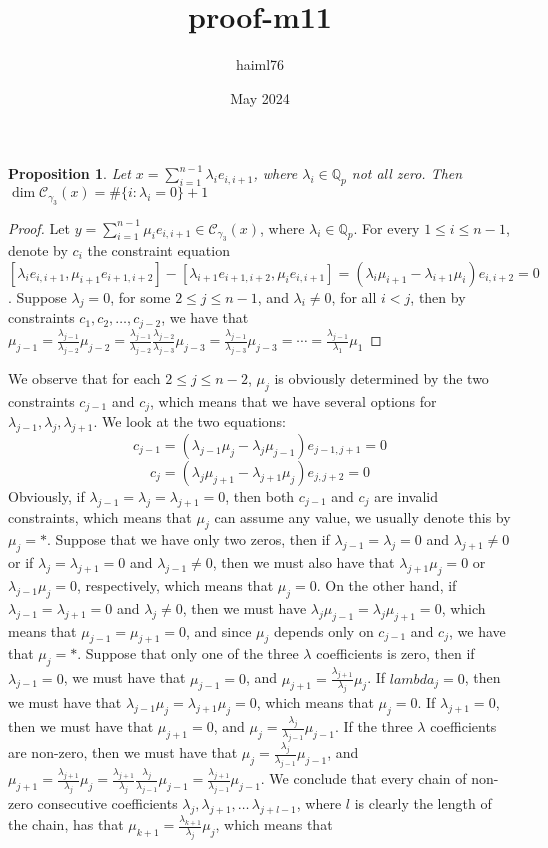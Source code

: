 \documentclass[12pt]{article}
\title{proof-m11}
\author{haiml76 }
\date{May 2024}
\newtheorem{proposition}[theorem]{Proposition}
\begin{document}
\begin{proposition}
Let $x=\sum_{i=1}^{n-1}\lambda_i e_{i,i+1}$, where $\lambda_i\in\mathbb{Q}_p$ not all zero. Then $\dim\mathcal{C}_{\gamma_3}(x)=\#\{i : \lambda_i=0\}+1$
\end{proposition}
\begin{proof}
Let $y=\sum_{i=1}^{n-1}\mu_i e_{i,i+1}\in\mathcal{C}_{\gamma_3}(x)$, where $\lambda_i\in\mathbb{Q}_p$.
For every $1\leq i\leq n-1$, denote by $c_i$ the constraint equation $[\lambda_i e_{i,i+1},\mu_{i+1}e_{i+1,i+2}]-[\lambda_{i+1}e_{i+1,i+2},\mu_i e_{i,i+1}]=(\lambda_i\mu_{i+1}-\lambda_{i+1}\mu_i)e_{i,i+2}=0$. Suppose $\lambda_j=0$, for some $2\leq j\leq n-1$, and $\lambda_i\neq 0$, for all $i<j$, then by constraints $c_1,c_2,\dots,c_{j-2}$, we have that $\mu_{j-1}=\frac{\lambda_{j-1}}{\lambda_{j-2}}\mu_{j-2}=\frac{\lambda_{j-1}}{\lambda_{j-2}}\frac{\lambda_{j-2}}{\lambda_{j-3}}\mu_{j-3}=\frac{\lambda_{j-1}}{\lambda_{j-3}}\mu_{j-3}=\cdots=\frac{\lambda_{j-1}}{\lambda_1}\mu_1$
\end{proof}




We observe that for each $2\leq j\leq n-2$, $\mu_j$ is obviously determined by the two constraints $c_{j-1}$ and $c_j$, which means that we have several options for $\lambda_{j-1},\lambda_j,\lambda_{j+1}$. We look at the two equations: \[
c_{j-1}=(\lambda_{j-1}\mu_j-\lambda_j\mu_{j-1})e_{j-1,j+1}=0
\]\[
c_j=(\lambda_j\mu_{j+1}-\lambda_{j+1}\mu_j)e_{j,j+2}=0
\]
Obviously, if $\lambda_{j-1}=\lambda_j=\lambda_{j+1}=0$, then both $c_{j-1}$ and $c_j$ are invalid constraints, which means that $\mu_j$ can assume any value, we usually denote this by $\mu_j=\ast$.
Suppose that we have only two zeros, then if $\lambda_{j-1}=\lambda_j=0$ and $\lambda_{j+1}\neq 0$ or if $\lambda_j=\lambda_{j+1}=0$ and $\lambda_{j-1}\neq 0$, then we must also have that $\lambda_{j+1}\mu_j=0$ or $\lambda_{j-1}\mu_j=0$, respectively, which means that $\mu_j=0$. On the other hand, if $\lambda_{j-1}=\lambda_{j+1}=0$ and $\lambda_j\neq 0$, then we must have $
\lambda_j\mu_{j-1}=\lambda_j\mu_{j+1}=0$, which means that $\mu_{j-1}=\mu_{j+1}=0$, and since $\mu_j$ depends only on $c_{j-1}$ and $c_j$, we have that $\mu_j=\ast$.
Suppose that only one of the three $\lambda$ coefficients is zero, then if $\lambda_{j-1}=0$, we must have that $\mu_{j-1}=0$, and $\mu_{j+1}=\frac{\lambda_{j+1}}{\lambda_j}\mu_j$. If $lambda_j=0$, then we must have that $\lambda_{j-1}\mu_j=\lambda_{j+1}\mu_j=0$, which means that $\mu_j=0$. If $\lambda_{j+1}=0$, then we must have that $\mu_{j+1}=0$, and $\mu_j=\frac{\lambda_j}{\lambda_{j-1}}\mu_{j-1}$. If the three $\lambda$ coefficients are non-zero, then we must have that $\mu_j=\frac{\lambda_j}{\lambda_{j-1}}\mu_{j-1}$, and $\mu_{j+1}=\frac{\lambda_{j+1}}{\lambda_j}\mu_j=\frac{\lambda_{j+1}}{\lambda_j}\frac{\lambda_j}{\lambda_{j-1}}\mu_{j-1}=\frac{\lambda_{j+1}}{\lambda_{j-1}}\mu_{j-1}$. We conclude that every chain of non-zero consecutive coefficients $\lambda_j,\lambda_{j+1},\dots\,\lambda_{j+l-1}$, where $l$ is clearly the length of the chain, has that $\mu_{k+1}=\frac{\lambda_{k+1}}{\lambda_j}\mu_j$, which means that 
\end{document}
